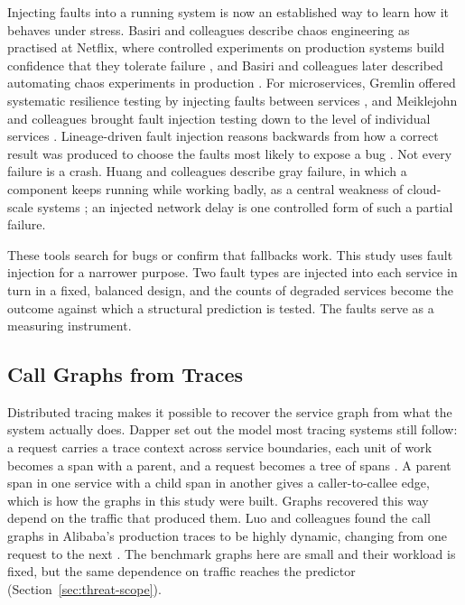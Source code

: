 Injecting faults into a running system is now an established way to learn how it behaves under
stress. Basiri and colleagues describe chaos engineering as practised at Netflix, where
controlled experiments on production systems build confidence that they tolerate failure
\cite{basiri2016}, and Basiri and colleagues later described automating chaos experiments in
production \cite{basiri2019}. For microservices, Gremlin offered systematic resilience testing by injecting
faults between services \cite{heorhiadi2016}, and Meiklejohn and colleagues brought fault
injection testing down to the level of individual services \cite{meiklejohn2021}.
Lineage-driven fault injection reasons backwards from how a correct result was produced to
choose the faults most likely to expose a bug \cite{alvaro2015}. Not every failure is a crash.
Huang and colleagues describe gray failure, in which a component keeps running while working
badly, as a central weakness of cloud-scale systems \cite{huang2017}; an injected network delay
is one controlled form of such a partial failure.

These tools search for bugs or confirm that fallbacks work. This study uses fault injection
for a narrower purpose. Two fault types are injected into each service in turn in a fixed,
balanced design, and the counts of degraded services become the outcome against which a
structural prediction is tested. The faults serve as a measuring instrument.

\subsection{Call Graphs from Traces}

Distributed tracing makes it possible to recover the service graph from what the system
actually does. Dapper set out the model most tracing systems still follow: a request carries a
trace context across service boundaries, each unit of work becomes a span with a parent, and a
request becomes a tree of spans \cite{sigelman2010}. A parent span in one service with a child
span in another gives a caller-to-callee edge, which is how the graphs in this study were
built. Graphs recovered this way depend on the traffic that produced them. Luo and colleagues
found the call graphs in Alibaba's production traces to be highly dynamic, changing from one
request to the next \cite{luo2021}. The benchmark graphs here are small and their workload is
fixed, but the same dependence on traffic reaches the predictor
(Section~\ref{sec:threat-scope}).


